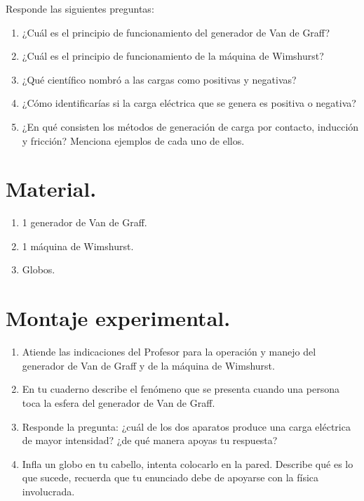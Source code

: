 \documentclass[14pt]{extarticle}
\begin{document}
Responde las siguientes preguntas:
\begin{enumerate}
\item ¿Cuál es el principio de funcionamiento del generador de Van de Graff?
\item ¿Cuál es el principio de funcionamiento de la máquina de Wimshurst?
\item ¿Qué científico nombró a las cargas como positivas y negativas?
\item ¿Cómo identificarías si la carga eléctrica que se genera es positiva o negativa?
\item ¿En qué consisten los métodos de generación de carga por contacto, inducción y fricción? Menciona ejemplos de cada uno de ellos.
\end{enumerate}

\section{Material.}

\begin{enumerate}[label=\alph*)]
\item 1 generador de Van de Graff.
\item 1 máquina de Wimshurst.
\item Globos.
\end{enumerate}

\section{Montaje experimental.}

\begin{enumerate}
\item Atiende las indicaciones del Profesor para la operación y manejo del generador de Van de Graff y de la máquina de Wimshurst.
\item En tu cuaderno describe el fenómeno que se presenta cuando una persona toca la esfera del generador de Van de Graff.
\item Responde la pregunta: ¿cuál de los dos aparatos produce una carga eléctrica de mayor intensidad? ¿de qué manera apoyas tu respuesta?
\item Infla un globo en tu cabello, intenta colocarlo en la pared. Describe qué es lo que sucede, recuerda que tu enunciado debe de apoyarse con la física involucrada.
\end{enumerate}
\end{document}
